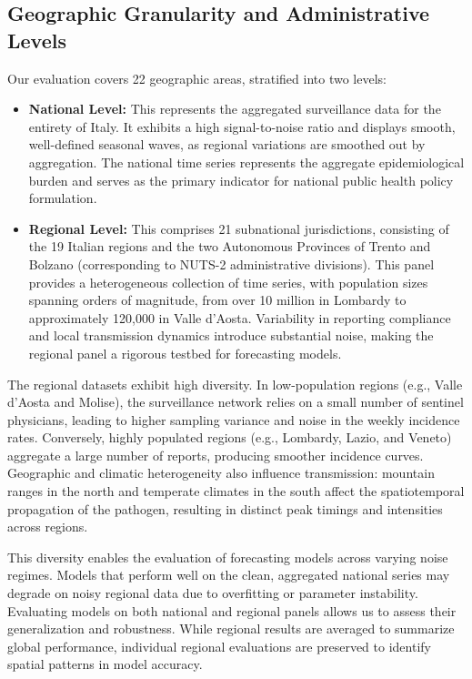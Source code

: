 \subsection{Geographic Granularity and Administrative Levels}
Our evaluation covers 22 geographic areas, stratified into two levels:
\begin{itemize}
    \item \textbf{National Level:} This represents the aggregated surveillance data for the entirety of Italy. It exhibits a high signal-to-noise ratio and displays smooth, well-defined seasonal waves, as regional variations are smoothed out by aggregation. The national time series represents the aggregate epidemiological burden and serves as the primary indicator for national public health policy formulation.
    \item \textbf{Regional Level:} This comprises 21 subnational jurisdictions, consisting of the 19 Italian regions and the two Autonomous Provinces of Trento and Bolzano (corresponding to NUTS-2 administrative divisions). This panel provides a heterogeneous collection of time series, with population sizes spanning orders of magnitude, from over 10 million in Lombardy to approximately 120,000 in Valle d'Aosta. Variability in reporting compliance and local transmission dynamics introduce substantial noise, making the regional panel a rigorous testbed for forecasting models.
\end{itemize}

The regional datasets exhibit high diversity. In low-population regions (e.g., Valle d'Aosta and Molise), the surveillance network relies on a small number of sentinel physicians, leading to higher sampling variance and noise in the weekly incidence rates. Conversely, highly populated regions (e.g., Lombardy, Lazio, and Veneto) aggregate a large number of reports, producing smoother incidence curves. Geographic and climatic heterogeneity also influence transmission: mountain ranges in the north and temperate climates in the south affect the spatiotemporal propagation of the pathogen, resulting in distinct peak timings and intensities across regions.

This diversity enables the evaluation of forecasting models across varying noise regimes. Models that perform well on the clean, aggregated national series may degrade on noisy regional data due to overfitting or parameter instability. Evaluating models on both national and regional panels allows us to assess their generalization and robustness. While regional results are averaged to summarize global performance, individual regional evaluations are preserved to identify spatial patterns in model accuracy.

